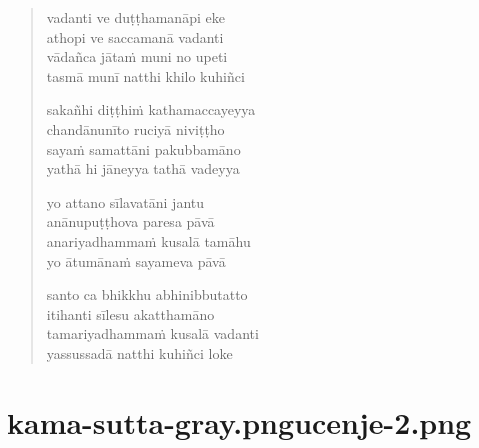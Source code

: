 

\cleartoverso

\vspace*{30mm}

\begin{verse}

vadanti ve duṭṭhamanāpi eke\\
athopi ve saccamanā vadanti\\
vādañca jātaṁ muni no upeti\\
tasmā munī natthi khilo kuhiñci

sakañhi diṭṭhiṁ kathamaccayeyya\\
chandānunīto ruciyā niviṭṭho\\
sayaṁ samattāni pakubbamāno\\
yathā hi jāneyya tathā vadeyya

yo attano sīlavatāni jantu\\
anānupuṭṭhova paresa pāvā\\
anariyadhammaṁ kusalā tamāhu\\
yo ātumānaṁ sayameva pāvā

santo ca bhikkhu abhinibbutatto\\
itihanti sīlesu akatthamāno\\
tamariyadhammaṁ kusalā vadanti\\
yassussadā natthi kuhiñci loke

\end{verse}


\chapter[Duṭṭhaṭṭhaka Sutta]{{kama-sutta-gray.png}{ucenje-2.png}}



